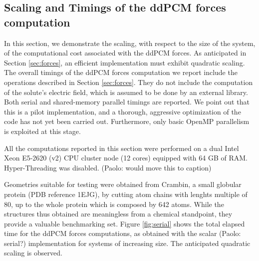 % 





\subsection{Scaling and Timings of the ddPCM forces computation}
In this section, we demonstrate the scaling, with respect to the size of the system, of the computational cost associated with the ddPCM forces. As anticipated in Section \ref{sec:forces}, an efficient implementation must exhibit quadratic scaling. The overall timings of the ddPCM forces computation we report include the operations described in Section \ref{sec:forces}. They do not include the computation of the solute's electric field, which is assumed to be done by an external library. Both serial and shared-memory parallel timings are reported. We point out that this is a pilot implementation, and a thorough, aggressive optimization of the code has not yet been carried out. Furthermore, only basic OpenMP parallelism is exploited at this stage.

{\color{red}All the computations reported in this section were performed on a dual Intel Xeon E5-2620 (v2) CPU cluster node (12 cores) equipped with 64 GB of RAM. Hyper-Threading was disabled. (Paolo: would move this to caption)}

Geometries suitable for testing were obtained from Crambin, a small globular protein (PDB reference 1EJG), by cutting atom chains with lenghts multiple of 80, up to the whole protein which is composed by 642 atoms. While the structures thus obtained are meaningless from a chemical standpoint, they provide a valuable benchmarking set. Figure \ref{fig:serial} shows the total elapsed time for the ddPCM forces computations, as obtained with the {\color{red}scalar (Paolo: serial?)} implementation for systems of increasing size. The anticipated quadratic scaling is observed.

